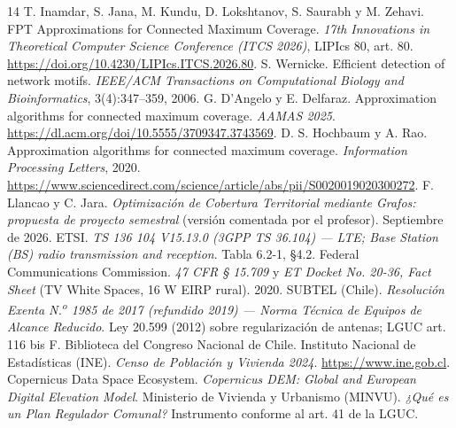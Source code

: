 \documentclass[12pt,letterpaper]{article}
\begin{document}
\begin{thebibliography}{14}
 T. Inamdar, S. Jana, M. Kundu, D. Lokshtanov, S. Saurabh y M. Zehavi. FPT Approximations for Connected Maximum Coverage. \emph{17th Innovations in Theoretical Computer Science Conference (ITCS 2026)}, LIPIcs 80, art. 80. \url{https://doi.org/10.4230/LIPIcs.ITCS.2026.80}.
 S. Wernicke. Efficient detection of network motifs. \emph{IEEE/ACM Transactions on Computational Biology and Bioinformatics}, 3(4):347--359, 2006.
 G. D'Angelo y E. Delfaraz. Approximation algorithms for connected maximum coverage. \emph{AAMAS 2025}. \url{https://dl.acm.org/doi/10.5555/3709347.3743569}.
 D. S. Hochbaum y A. Rao. Approximation algorithms for connected maximum coverage. \emph{Information Processing Letters}, 2020. \url{https://www.sciencedirect.com/science/article/abs/pii/S0020019020300272}.
 F. Llancao y C. Jara. \emph{Optimización de Cobertura Territorial mediante Grafos: propuesta de proyecto semestral} (versión comentada por el profesor). Septiembre de 2026.
 ETSI. \emph{TS 136 104 V15.13.0 (3GPP TS 36.104) --- LTE; Base Station (BS) radio transmission and reception}. Tabla 6.2-1, §4.2.
 Federal Communications Commission. \emph{47 CFR § 15.709} y \emph{ET Docket No. 20-36, Fact Sheet} (TV White Spaces, 16 W EIRP rural). 2020.
 SUBTEL (Chile). \emph{Resolución Exenta N.\textsuperscript{o} 1985 de 2017 (refundido 2019) --- Norma Técnica de Equipos de Alcance Reducido}.
 Ley 20.599 (2012) sobre regularización de antenas; LGUC art. 116 bis F. Biblioteca del Congreso Nacional de Chile.
 Instituto Nacional de Estadísticas (INE). \emph{Censo de Población y Vivienda 2024}. \url{https://www.ine.gob.cl}.
 Copernicus Data Space Ecosystem. \emph{Copernicus DEM: Global and European Digital Elevation Model}.
 Ministerio de Vivienda y Urbanismo (MINVU). \emph{¿Qué es un Plan Regulador Comunal?} Instrumento conforme al art. 41 de la LGUC.
\end{thebibliography}
\end{document}
